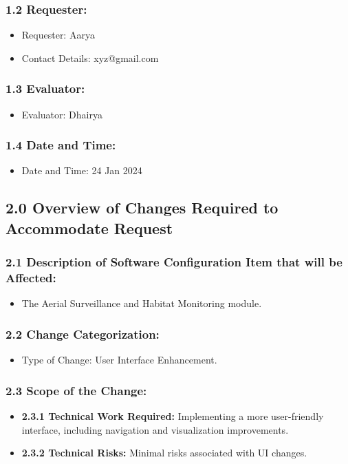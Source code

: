 \documentclass{article}
\begin{document}
\subsubsection*{1.2 Requester:}
\begin{itemize}
  \item Requester: Aarya
  \item Contact Details: xyz@gmail.com
\end{itemize}

\subsubsection*{1.3 Evaluator:}
\begin{itemize}
  \item Evaluator: Dhairya
\end{itemize}

\subsubsection*{1.4 Date and Time:}
\begin{itemize}
  \item Date and Time: 24 Jan 2024
\end{itemize}

\subsection*{2.0 Overview of Changes Required to Accommodate Request}

\subsubsection*{2.1 Description of Software Configuration Item that will be Affected:}
\begin{itemize}
  \item The Aerial Surveillance and Habitat Monitoring module.
\end{itemize}

\subsubsection*{2.2 Change Categorization:}
\begin{itemize}
  \item Type of Change: User Interface Enhancement.
\end{itemize}

\subsubsection*{2.3 Scope of the Change:}
\begin{itemize}
  \item \textbf{2.3.1 Technical Work Required:} Implementing a more user-friendly interface, including navigation and visualization improvements.
  \item \textbf{2.3.2 Technical Risks:} Minimal risks associated with UI changes.
\end{itemize}
\end{document}
